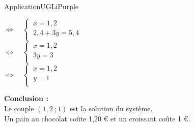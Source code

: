 \documentclass[a4paper,11pt,cours]{nsi}
\begin{document}
\begin{encadrecolore}{Application}{UGLiPurple}
\begin{tabbing}
		\>	$\Leftrightarrow\quad \left\{
		\begin{array}{l}
			\ x=1,2 \\
			\ 2,4 + 3y=5,4 \\
		\end{array} \right. $\\[1em]
	
		\>	$\Leftrightarrow\quad \left\{
		\begin{array}{l}
			\ x=1,2 \\
			\ 3y=3 \\
		\end{array} \right. $\\[1em]
	
		\>	$\Leftrightarrow\quad \left\{
		\begin{array}{l}
			\ x=1,2 \\
			\ y=1 \\
		\end{array} \right. $\\
	\end{tabbing}
	\textbf{Conclusion :}\\
	Le couple $(1,2\ ;1)$ est la solution du système.\\
	Un pain au chocolat coûte 1,20 € et un croissant coûte 1 €.
\end{encadrecolore}
\end{document}

